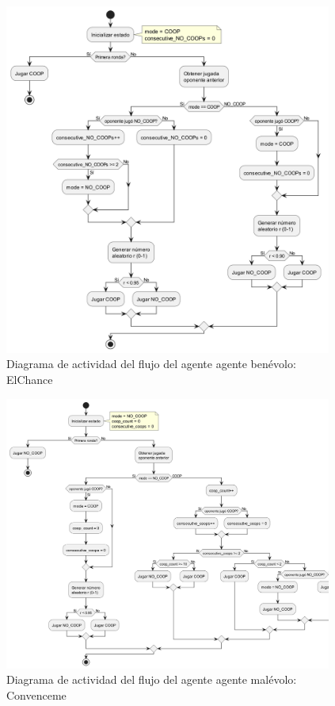 \documentclass{article}
\begin{document}
\begin{figure}[H]        
  \centering             
  \includegraphics[width=0.96\textwidth]{diagrams/flow_chance.png}
  \caption{Diagrama de actividad del flujo del agente agente benévolo: ElChance}
  \label{fig:low_chance}
\end{figure}

\begin{figure}[H]        
  \centering             
  \includegraphics[width=0.96\textwidth]{diagrams/flow_convenceme.png}
  \caption{Diagrama de actividad del flujo del agente agente malévolo: Convenceme}
  \label{fig:flow_conven}
\end{figure}
\end{document}
